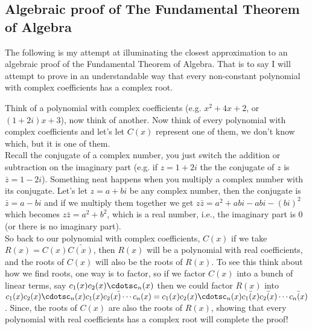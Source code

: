 \documentclass[12pt]{article}
\begin{document}
\subsection*{Algebraic proof of The Fundamental Theorem of Algebra}
The following is my attempt at illuminating the closest approximation to an algebraic proof of the Fundamental Theorem of Algebra.  That is to say I will attempt to prove in an understandable way that every non-constant polynomial with complex coefficients has a complex root.

%

Think of a polynomial with complex coefficients (e.g. $x^2+4x+2$, or $(1+2i)x+3$), now think of another.  Now think of every polynomial with complex coefficients and let's let $C(x)$ represent one of them, we don't know which, but it is one of them.\\

Recall the conjugate of a complex number, you just switch the addition or subtraction on the imaginary part (e.g. if $z = 1+2i$ the the conjugate of $z$ is $\bar{z} = 1 - 2i$).  Something neat happens when you multiply a complex number with its conjugate. Let's let $z=a+bi$ be any complex number, then the conjugate is $\bar{z}=a-bi$ and if we multiply them together we get $z\bar{z}=a^2+abi-abi-(bi)^2$ which becomes $z\bar{z}=a^2+b^2$, which is a real number, i.e., the imaginary part is 0 (or there is no imaginary part).\\

So back to our polynomial with complex coefficients, $C(x)$ if we take $R(x) = C(x) \bar{C(x)}$, then $R(x)$ will be a polynomial with real coefficients, and the roots of $C(x)$ will also be the roots of $R(x)$.  To see this think about how we find roots, one way is to factor, so if we factor $C(x)$ into a bunch of linear terms, say $c_1(x)c_2(x)\cdotsc_n(x)$ then we could factor $R(x)$ into $c_1(x)c_2(x)\cdotsc_n(x)\bar{c_1(x)c_2(x) \cdots c_n(x)}=c_1(x)c_2(x)\cdotsc_n(x)\bar{c_1(x)}\bar{c_2(x)}\cdots \bar{c_n(x)}$.  Since, the roots of $C(x)$ are also the roots of $R(x)$, showing that every polynomial with real coefficients has a complex root will complete the proof!\\
\end{document}
